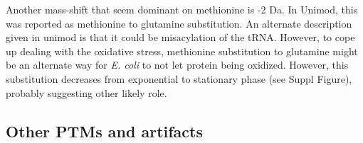\documentclass[12pt]{article}
\begin{document}
Another mass-shift that seem dominant on methionine is -2 Da. In Unimod, this was reported as methionine to glutamine substitution. An alternate description given in unimod is that it could be misacylation of the tRNA. However, to cope up dealing with the oxidative stress, methionine substitution to glutamine might be an alternate way for \emph{E. coli} to not let protein being oxidized. However, this substitution decreases from exponential to stationary phase (see Suppl Figure), probably suggesting other likely role.

\subsection{Other PTMs and artifacts}
\end{document}

